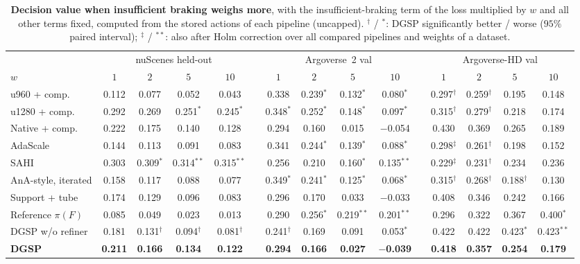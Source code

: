 \documentclass[10pt,letterpaper]{article}
\newcommand{\method}{DGSP\xspace}
\newcommand{\full}{F}
\newcommand{\policy}{\pi}
\newcommand{\oursrow}{\rowcolor{oursbg}}
\theoremstyle{remark}
\theoremstyle{plain}
\theoremstyle{definition}
\begin{document}
\begin{table}[!htbp]
\centering
\caption{\textbf{Decision value when insufficient braking weighs more}, with the insufficient-braking term of the loss multiplied by $w$ and all other terms fixed, computed from the stored actions of each pipeline (uncapped). $^{\dagger}$ / $^{\ast}$: \method significantly better / worse ($95\%$ paired interval); $^{\ddagger}$ / $^{\ast\ast}$: also after Holm correction over all compared pipelines and weights of a dataset.}
\label{tab:safety}
\footnotesize
\setlength{\tabcolsep}{1.9pt}
\begin{tabular}{@{}lcccccccccccccc@{}}
\toprule
 & \multicolumn{4}{c}{nuScenes held-out} & & \multicolumn{4}{c}{Argoverse~2 val} & & \multicolumn{4}{c}{Argoverse-HD val} \\
\cmidrule(lr){2-5}\cmidrule(lr){7-10}\cmidrule(l){12-15}
$w$ & $1$ & $2$ & $5$ & $10$ & & $1$ & $2$ & $5$ & $10$ & & $1$ & $2$ & $5$ & $10$ \\
\midrule
u960 + comp. & 0.112 & 0.077 & 0.052 & 0.043 & & 0.338 & 0.239$^{\ast}$ & 0.132$^{\ast}$ & 0.080$^{\ast}$ & & 0.297$^{\dagger}$ & 0.259$^{\dagger}$ & 0.195 & 0.148 \\
u1280 + comp. & 0.292 & 0.269 & 0.251$^{\ast}$ & 0.245$^{\ast}$ & & 0.348$^{\ast}$ & 0.252$^{\ast}$ & 0.148$^{\ast}$ & 0.097$^{\ast}$ & & 0.315$^{\dagger}$ & 0.279$^{\dagger}$ & 0.218 & 0.174 \\
Native + comp. & 0.222 & 0.175 & 0.140 & 0.128 & & 0.294 & 0.160 & 0.015 & $-$0.054 & & 0.430 & 0.369 & 0.265 & 0.189 \\
AdaScale & 0.144 & 0.113 & 0.091 & 0.083 & & 0.341 & 0.244$^{\ast}$ & 0.139$^{\ast}$ & 0.088$^{\ast}$ & & 0.298$^{\ddagger}$ & 0.261$^{\dagger}$ & 0.198 & 0.152 \\
SAHI & 0.303 & 0.309$^{\ast}$ & 0.314$^{\ast\ast}$ & 0.315$^{\ast\ast}$ & & 0.256 & 0.210 & 0.160$^{\ast}$ & 0.135$^{\ast\ast}$ & & 0.229$^{\ddagger}$ & 0.231$^{\dagger}$ & 0.234 & 0.236 \\
AnA-style, iterated & 0.158 & 0.117 & 0.088 & 0.077 & & 0.349$^{\ast}$ & 0.241$^{\ast}$ & 0.125$^{\ast}$ & 0.068$^{\ast}$ & & 0.315$^{\dagger}$ & 0.268$^{\dagger}$ & 0.188$^{\dagger}$ & 0.130 \\
Support + tube & 0.174 & 0.129 & 0.096 & 0.083 & & 0.296 & 0.170 & 0.033 & $-$0.033 & & 0.408 & 0.346 & 0.242 & 0.166 \\
Reference $\policy(\full)$ & 0.085 & 0.049 & 0.023 & 0.013 & & 0.290 & 0.256$^{\ast}$ & 0.219$^{\ast\ast}$ & 0.201$^{\ast\ast}$ & & 0.296 & 0.322 & 0.367 & 0.400$^{\ast}$ \\
\method w/o refiner & 0.181 & 0.131$^{\dagger}$ & 0.094$^{\dagger}$ & 0.081$^{\dagger}$ & & 0.241$^{\dagger}$ & 0.169 & 0.091 & 0.053$^{\ast}$ & & 0.422 & 0.422 & 0.423$^{\ast}$ & 0.423$^{\ast\ast}$ \\
\oursrow \textbf{\method} & \textbf{0.211} & \textbf{0.166} & \textbf{0.134} & \textbf{0.122} & & \textbf{0.294} & \textbf{0.166} & \textbf{0.027} & \textbf{$-$0.039} & & \textbf{0.418} & \textbf{0.357} & \textbf{0.254} & \textbf{0.179} \\
\bottomrule
\end{tabular}
\end{table}
\end{document}
